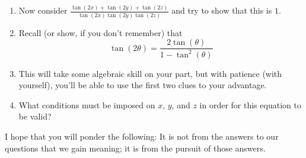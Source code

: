 \documentclass[english]{book}
\begin{document}
\begin{enumerate}
\begin{enumerate}
\begin{enumerate}[\hspace{1cm}a)]
                      \vspace{0.3cm}
                      
                      If you haven't put in much effort on this problem, you won't see much relevance that these so-called clues have to the problem.
                \item Now consider $\frac{\tan(2x)+\tan(2y)+\tan(2z)}{\tan(2x) \tan(2y) \tan(2z)}$ and try to show that this is $1$.
                \item Recall (or show, if you don't remember) that
                      \begin{equation*}
                      \tan(2\theta) = \frac{2 \tan(\theta)}{1- \tan^{2}(\theta)}
                      \end{equation*}
                \item This will take some algebraic skill on your part, but with patience (with yourself), you'll be able to use the first two clues to your advantage.
                \item What conditions must be imposed on $x$, $y$, and $z$ in order for this equation to be valid?
              \end{enumerate}

    \end{enumerate}

\end{enumerate}

\vspace{2cm}

\begin{center}
I hope that you will ponder the following: It is not from the answers to our questions that we gain meaning; it is from the pursuit of those answers.
\end{center}
\end{document}
